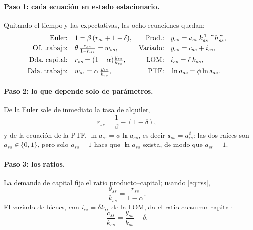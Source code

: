 \documentclass[11pt,a4paper]{report}
\begin{document}
\paragraph{Paso 1: cada ecuación en estado estacionario.} Quitando el tiempo y las
expectativas, las ocho ecuaciones quedan:
\begin{align}
\text{Euler:}&\quad 1=\beta\,(r_{ss}+1-\delta), &
\text{Prod.:}&\quad y_{ss}=a_{ss}\,k_{ss}^{\,1-\alpha}h_{ss}^{\,\alpha}, \notag\\
\text{Of.\ trabajo:}&\quad \theta\,\tfrac{c_{ss}}{1-h_{ss}}=w_{ss}, &
\text{Vaciado:}&\quad y_{ss}=c_{ss}+i_{ss}, \notag\\
\text{Dda.\ capital:}&\quad r_{ss}=(1-\alpha)\tfrac{y_{ss}}{k_{ss}}, &
\text{LOM:}&\quad i_{ss}=\delta\,k_{ss}, \notag\\
\text{Dda.\ trabajo:}&\quad w_{ss}=\alpha\,\tfrac{y_{ss}}{h_{ss}}, &
\text{PTF:}&\quad \ln a_{ss}=\phi\ln a_{ss}. \label{eq:sssystem}
\end{align}

\paragraph{Paso 2: lo que depende solo de parámetros.} De la Euler sale de inmediato
la tasa de alquiler,
\begin{equation}
r_{ss}=\frac{1}{\beta}-(1-\delta), \label{eq:rss}
\end{equation}
y de la ecuación de la PTF, $\ln a_{ss}=\phi\ln a_{ss}$, es decir $a_{ss}=a_{ss}^{\phi}$:
las dos raíces son $a_{ss}\in\{0,1\}$, pero solo $a_{ss}=1$ hace que $\ln a_{ss}$ exista,
de modo que $a_{ss}=1$.

\paragraph{Paso 3: los ratios.} La demanda de capital fija el ratio
producto--capital; usando \eqref{eq:rss},
\begin{equation}
\frac{y_{ss}}{k_{ss}}=\frac{r_{ss}}{1-\alpha}. \label{eq:yk}
\end{equation}
El vaciado de bienes, con $i_{ss}=\delta k_{ss}$ de la LOM, da el ratio
consumo--capital:
\begin{equation}
\frac{c_{ss}}{k_{ss}}=\frac{y_{ss}}{k_{ss}}-\delta. \label{eq:ck}
\end{equation}
\end{document}
